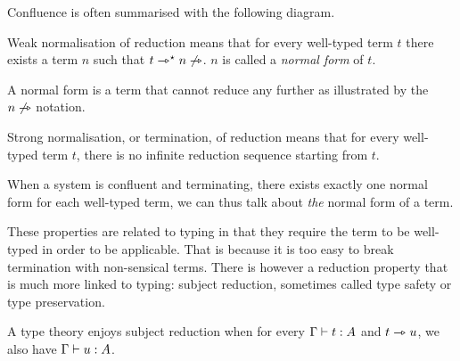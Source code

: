 Confluence is often summarised with the following diagram.

\begin{center}
\end{center}

\begin{definition}
  Weak normalisation of reduction means that for every well-typed term \(t\)
  there exists a term \(n\) such that \(t \rightarrowtriangle^{\star} n \not\rightarrowtriangle\).
  \(n\) is called a \emph{normal form} of \(t\).
\end{definition}

A normal form is a term that cannot reduce any further as illustrated by the
\(n \not\rightarrowtriangle\) notation.

\begin{definition}
  Strong normalisation, or termination, of reduction means that for every
  well-typed term \(t\), there is no infinite reduction sequence starting from
  \(t\).
\end{definition}

When a system is confluent and terminating, there exists exactly one normal form
for each well-typed term, we can thus talk about \emph{the} normal form of a
term.

These properties are related to typing in that they require the term to be
well-typed in order to be applicable. That is because it is too easy to break
termination with non-sensical terms.
There is however a reduction property that is much more linked to typing:
subject reduction, sometimes called type safety or type preservation.

\begin{definition}
  A type theory enjoys subject reduction when for every \(\Gamma \vdash t : A\)
  and \(t \rightarrowtriangle u\), we also have \(\Gamma \vdash u : A\).
\end{definition}

